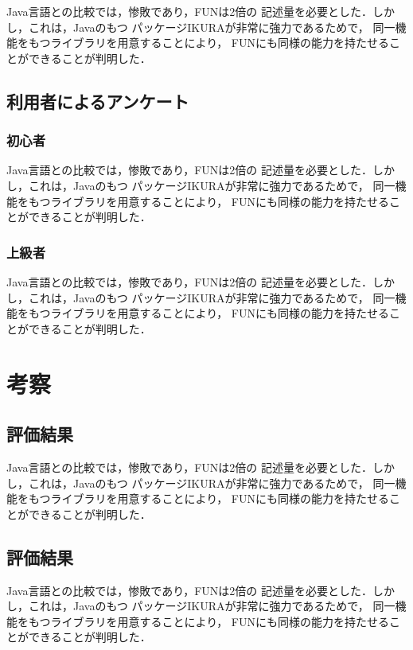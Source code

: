\documentclass{funthesis}
\begin{document}
Java言語との比較では，惨敗であり，FUNは2倍の
記述量を必要とした．しかし，これは，Javaのもつ
パッケージIKURAが非常に強力であるためで，
同一機能をもつライブラリを用意することにより，
FUNにも同様の能力を持たせることができることが判明した．

\section{利用者によるアンケート}

\subsection{初心者}

Java言語との比較では，惨敗であり，FUNは2倍の
記述量を必要とした．しかし，これは，Javaのもつ
パッケージIKURAが非常に強力であるためで，
同一機能をもつライブラリを用意することにより，
FUNにも同様の能力を持たせることができることが判明した．

\subsection{上級者}

Java言語との比較では，惨敗であり，FUNは2倍の
記述量を必要とした．しかし，これは，Javaのもつ
パッケージIKURAが非常に強力であるためで，
同一機能をもつライブラリを用意することにより，
FUNにも同様の能力を持たせることができることが判明した．


\chapter{考察}

\section{評価結果}

Java言語との比較では，惨敗であり，FUNは2倍の
記述量を必要とした．しかし，これは，Javaのもつ
パッケージIKURAが非常に強力であるためで，
同一機能をもつライブラリを用意することにより，
FUNにも同様の能力を持たせることができることが判明した．

\section{評価結果}

Java言語との比較では，惨敗であり，FUNは2倍の
記述量を必要とした．しかし，これは，Javaのもつ
パッケージIKURAが非常に強力であるためで，
同一機能をもつライブラリを用意することにより，
FUNにも同様の能力を持たせることができることが判明した．
\end{document}
